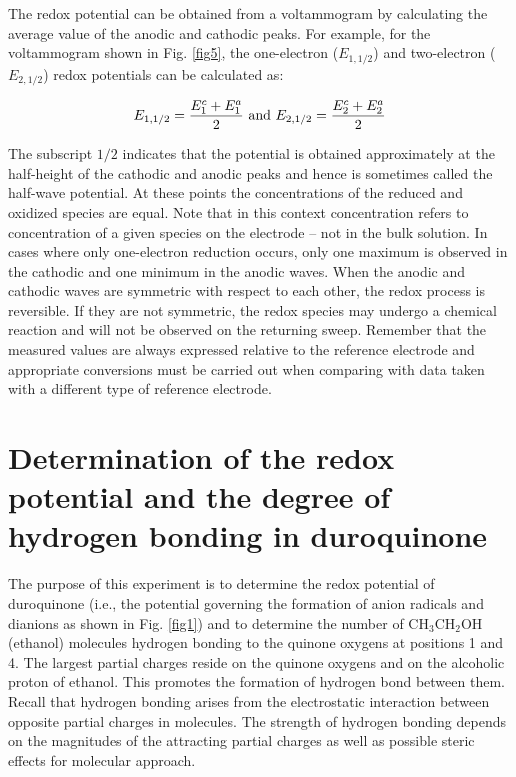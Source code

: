 \documentclass[byrevtex,amssymb,aps,pra,floatfix,letterpaper]{revtex4}
\begin{document}
The redox potential can be obtained from a voltammogram by calculating the average value of the anodic and cathodic peaks. For example, for the voltammogram
shown in Fig. \ref{fig5}, the one-electron ($E_{1,1/2}$) and two-electron ($E_{2,1/2}$) redox potentials can be calculated as:

\begin{equation}
\label{eq1}
E_{1,1/2} = \frac{E_1^c + E_1^a}{2}\textnormal{ and }E_{2,1/2} = \frac{E_2^c + E_2^a}{2}
\end{equation}

\noindent
The subscript $1/2$ indicates that the potential is obtained approximately at the half-height of the cathodic and anodic peaks and hence is sometimes called the half-wave potential. At these points the concentrations of the reduced and oxidized species are equal. Note that in this context concentration refers to concentration of a given species on the electrode -- not in the bulk solution. In cases where only one-electron reduction occurs, only one maximum is observed in the cathodic and one minimum in the anodic waves. When the anodic and cathodic waves are symmetric with respect to each other, the redox process is reversible. If they are not symmetric, the redox species may undergo a chemical reaction and will not be observed on the returning sweep. Remember that the measured values are
always expressed relative to the reference electrode and appropriate conversions must be carried out when comparing with data taken with a different type of reference electrode.

\section{Determination of the redox potential and the degree of hydrogen bonding in duroquinone}

The purpose of this experiment is to determine the redox potential of duroquinone (i.e., the potential governing the formation of anion radicals and dianions as shown in Fig. \ref{fig1}) and to determine the number of CH$_3$CH$_2$OH (ethanol) molecules hydrogen bonding to the quinone oxygens at positions 1 and 4. The largest partial charges reside on the quinone oxygens and on the alcoholic proton of ethanol. This promotes the formation of hydrogen bond between them. Recall that hydrogen bonding arises from the electrostatic interaction between opposite partial charges in molecules. The strength of hydrogen bonding depends on the magnitudes of the attracting partial charges as well as possible steric effects for molecular approach.
\end{document}
